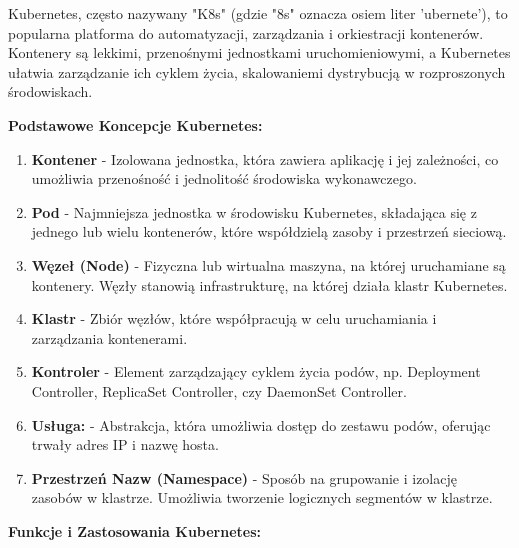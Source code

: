 \noindent Kubernetes, często nazywany "K8s" (gdzie "8s" oznacza osiem liter 'ubernete'), to popularna platforma do automatyzacji, zarządzania i orkiestracji kontenerów. Kontenery są lekkimi, przenośnymi jednostkami uruchomieniowymi, a Kubernetes ułatwia zarządzanie ich cyklem życia, skalowaniem\linebreak i dystrybucją w rozproszonych środowiskach.

\clearpage

{\bf Podstawowe Koncepcje Kubernetes:}

\begin{enumerate}
\item {\bf Kontener}
   - Izolowana jednostka, która zawiera aplikację i jej zależności, co umożliwia przenośność i jednolitość środowiska wykonawczego.

\item {\bf Pod}
   - Najmniejsza jednostka w środowisku Kubernetes, składająca się z jednego lub wielu kontenerów, które współdzielą zasoby i przestrzeń sieciową.

\item {\bf Węzeł (Node)}
   - Fizyczna lub wirtualna maszyna, na której uruchamiane są kontenery. Węzły stanowią infrastrukturę, na której działa klastr Kubernetes.

\item {\bf Klastr}
   - Zbiór węzłów, które współpracują w celu uruchamiania i zarządzania kontenerami.

\item {\bf Kontroler}
   - Element zarządzający cyklem życia podów, np. Deployment Controller, ReplicaSet Controller, czy DaemonSet Controller.

\item {\bf Usługa:}
   - Abstrakcja, która umożliwia dostęp do zestawu podów, oferując trwały adres IP i nazwę hosta.

\item {\bf Przestrzeń Nazw (Namespace)}
   - Sposób na grupowanie i izolację zasobów w klastrze. Umożliwia tworzenie logicznych segmentów w klastrze.
\end{enumerate}

{\bf Funkcje i Zastosowania Kubernetes:}

